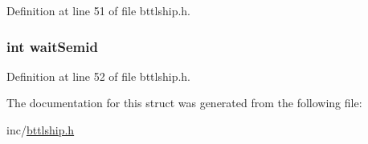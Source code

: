 Definition at line 51 of file bttlship.h.

\hypertarget{struct_s___t_a_b_l_e_a9f1f2d138b13036572e13571aabb6120}{
\subsubsection[{waitSemid}]{\setlength{\rightskip}{0pt plus 5cm}int {\bf waitSemid}}}
\label{struct_s___t_a_b_l_e_a9f1f2d138b13036572e13571aabb6120}


Definition at line 52 of file bttlship.h.



The documentation for this struct was generated from the following file:\begin{DoxyCompactItemize}
\item 
inc/\hyperlink{bttlship_8h}{bttlship.h}\end{DoxyCompactItemize}
